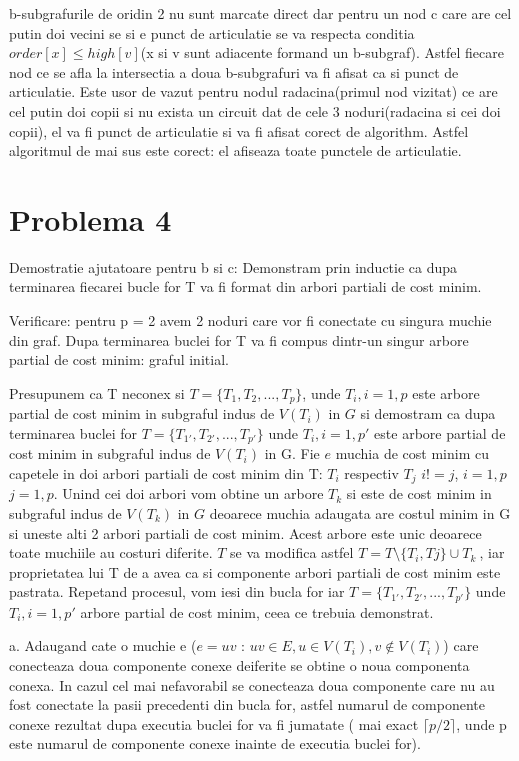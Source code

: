 \documentclass[11pt,leqno]{article}
\begin{document}
    b-subgrafurile de oridin 2 nu sunt marcate direct dar pentru un nod c care are cel putin doi vecini
    se si e punct de articulatie se va respecta conditia $order[x] \leq high[v]$(x si v sunt adiacente formand un b-subgraf).
    Astfel fiecare nod ce se afla la intersectia a doua b-subgrafuri va fi afisat ca si punct de articulatie.
    Este usor de vazut pentru nodul radacina(primul nod vizitat) ce are cel putin doi copii si nu exista un circuit dat de cele 3 noduri(radacina si cei doi copii), el va fi punct de articulatie si va fi afisat corect de algorithm.
    Astfel algoritmul de mai sus este corect: el afiseaza toate punctele de articulatie.


% 

\section*{Problema 4} 

Demostratie ajutatoare pentru b si c: Demonstram prin inductie ca dupa terminarea fiecarei bucle for T va fi format din arbori partiali de cost minim.

Verificare: pentru p = 2 avem 2 noduri care vor fi conectate cu singura muchie din graf. Dupa terminarea buclei for T va fi compus dintr-un singur arbore partial de cost minim: graful initial.

Presupunem ca T neconex si $ T = \{T_{1}, T_{2}, ..., T_{p}\} $, unde $ T_i, i = 1, p $ este arbore partial de cost minim in subgraful indus de $V(T_i)$ in $G$ si demostram ca dupa terminarea buclei for $T = \{T_{1'}, T_{2'}, ..., T_{p'}\}$ unde $T_i, i = 1, p'$ este arbore partial de cost minim in subgraful indus de $V(T_i)$ in G.
Fie $e$ muchia de cost minim cu capetele in doi arbori partiali de cost minim din T: $ T_i$ respectiv $T_j$ $ i != j$, $i = 1,p$ $j = 1,p$.
Unind cei doi arbori vom obtine un arbore $T_k$ si este de cost minim in subgraful indus de $V(T_k)$ in $G$ deoarece muchia adaugata are costul minim in G si uneste alti 2 arbori partiali de cost minim. Acest arbore este unic deoarece toate muchiile au costuri diferite.
$T$ se va modifica astfel $T = T \setminus \{T_i, Tj\} \cup T_k \ $, iar proprietatea lui T de a avea ca si componente arbori partiali de cost minim este pastrata. Repetand procesul, vom iesi din bucla for iar
$T = \{T_{1'}, T_{2'}, ..., T_{p'}\}$ unde $T_i, i = 1, p'$ arbore partial de cost minim, ceea ce trebuia demonstrat.


a. Adaugand cate o muchie e ($ e=uv$ : $uv \in E, u \in V(T_i), v \notin V(T_i)$) care conecteaza doua componente conexe deiferite se obtine o noua componenta conexa. 
In cazul cel mai nefavorabil se conecteaza doua componente care nu au fost conectate la pasii precedenti din bucla for, astfel numarul de componente conexe rezultat dupa executia buclei for va fi jumatate ( mai exact $\lceil p/2 \rceil$, unde p este numarul de componente conexe inainte de executia buclei for).
\end{document}
